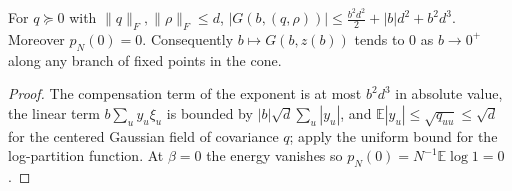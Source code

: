 \begin{theorem}[The pressure is small near $\beta=0$]\label{thm:sg-tal:vector-pressure-small}
\leanok
{}
For $q\succeq0$ with $\|q\|_F,\|\rho\|_F\le d$, $|G(b,(q,\rho))|\le\frac{b^2d^2}2+|b|d^2+b^2d^3$. Moreover $p_N(0)=0$. Consequently $b\mapsto G(b,z(b))$ tends to $0$ as $b\to0^+$ along any branch of fixed points in the cone.
\end{theorem}
\begin{proof}
\leanok
The compensation term of the exponent is at most $b^2d^3$ in absolute value, the linear term $b\sum_u y_u\xi_u$ is bounded by $|b|\sqrt d\sum_u|y_u|$, and $\mathbb E|y_u|\le\sqrt{q_{uu}}\le\sqrt d$ for the centered Gaussian field of covariance $q$; apply the uniform bound for the log-partition function. At $\beta=0$ the energy vanishes so $p_N(0)=N^{-1}\mathbb E\log 1=0$.
\end{proof}

